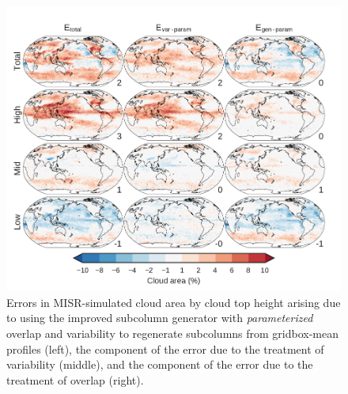 \begin{figure}[htbp]
\centering
\includegraphics{graphics/subgrid2_cldmisr_maps_gen-var-param_diff.pdf}
\caption{\label{fig:cldmisrMapsParamDiff}Errors in MISR-simulated cloud
area by cloud top height arising due to using the improved subcolumn
generator with \emph{parameterized} overlap and variability to
regenerate subcolumns from gridbox-mean profiles (left), the component
of the error due to the treatment of variability (middle), and the
component of the error due to the treatment of overlap
(right).}\label{fig:cldmisrMapsParamDiff}
\end{figure}

